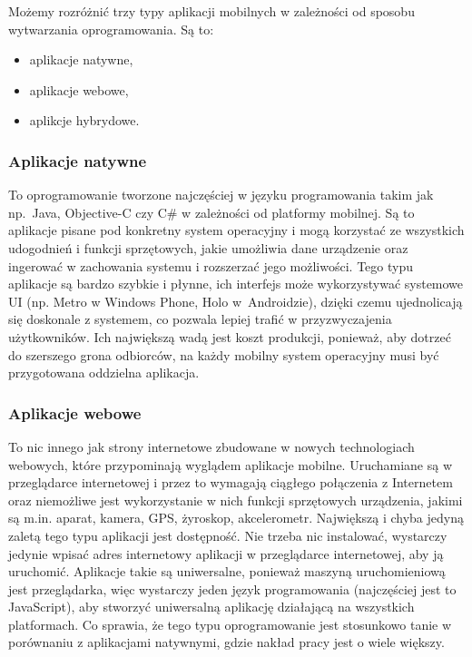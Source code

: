 \documentclass[twoside,a4paper,openright,12pt]{book}
\begin{document}
Możemy rozróżnić trzy typy aplikacji mobilnych w zależności od sposobu wytwarzania oprogramowania. Są to:
\begin{itemize}
\item aplikacje natywne,
\item aplikacje webowe,
\item aplikcje hybrydowe.
\end{itemize}

\subsubsection*{Aplikacje natywne}
To oprogramowanie tworzone najczęściej w języku programowania takim jak np.~Java, Objective-C czy C\# w zależności od platformy mobilnej. Są to aplikacje pisane pod konkretny system operacyjny i mogą korzystać ze wszystkich udogodnień i funkcji sprzętowych, jakie umożliwia dane urządzenie oraz ingerować w zachowania systemu i rozszerzać jego możliwości. Tego typu aplikacje są bardzo szybkie i płynne, ich interfejs może wykorzystywać systemowe UI (np. Metro w Windows Phone, Holo w~Androidzie), dzięki czemu ujednolicają się doskonale z systemem, co pozwala lepiej trafić w przyzwyczajenia użytkowników. Ich największą wadą jest koszt produkcji, ponieważ, aby dotrzeć do szerszego grona odbiorców, na każdy mobilny system operacyjny musi być przygotowana oddzielna aplikacja.

\subsubsection*{Aplikacje webowe}
To nic innego jak strony internetowe zbudowane w nowych technologiach webowych, które przypominają wyglądem aplikacje mobilne. Uruchamiane są w przeglądarce internetowej i przez to wymagają ciągłego połączenia z Internetem oraz niemożliwe jest wykorzystanie w nich funkcji sprzętowych urządzenia, jakimi są m.in. aparat, kamera, GPS, żyroskop, akcelerometr. Największą i chyba jedyną zaletą tego typu aplikacji jest dostępność. Nie trzeba nic instalować, wystarczy jedynie wpisać adres internetowy aplikacji w przeglądarce internetowej, aby ją uruchomić. Aplikacje takie są uniwersalne, ponieważ maszyną uruchomieniową jest przeglądarka, więc wystarczy jeden język programowania (najczęściej jest to JavaScript), aby stworzyć uniwersalną aplikację działającą na wszystkich platformach. Co sprawia, że tego typu oprogramowanie jest stosunkowo tanie w porównaniu z aplikacjami natywnymi, gdzie nakład pracy jest o wiele większy.
\end{document}
